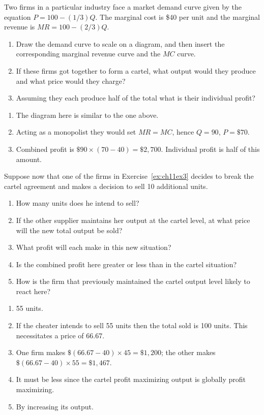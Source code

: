 \begin{enumialphparenastyle}
\begin{ex}\label{ex:ch11ex3}
Two firms in a particular industry face a market demand curve given by the equation $P=100-(1/3)Q$. The marginal cost is \$40 per unit and the marginal revenue is $MR=100-(2/3)Q$.
\begin{enumerate}
	\item	Draw the demand curve to scale on a diagram, and then insert the corresponding marginal revenue curve and the $MC$ curve.
	\item	If these firms got together to form a cartel, what output would they produce and what price would they charge? 
	\item	Assuming they each produce half of the total what is their individual profit?
\end{enumerate}
\begin{sol}
\begin{enumerate}
	\item	The diagram here is similar to the one above.
	\item	Acting as a monopolist they would set $MR=MC$, hence $Q=90$, $P=\$70$.
	\item	Combined profit is $\$90\times(70-40)=\$2,700$. Individual profit is half of this amount.
\end{enumerate}
\end{sol}
\end{ex}

\begin{ex}\label{ex:ch11ex4}
Suppose now that one of the firms in Exercise~\ref{ex:ch11ex3} decides to break the cartel agreement and makes a decision to sell 10 additional units.
\begin{enumerate}
	\item	How many units does he intend to sell?
	\item	If the other supplier maintains her output at the cartel level, at what price will the new total output be sold?
	\item	What profit will each make in this new situation?
	\item	Is the combined profit here greater or less than in the cartel situation?
	\item	How is the firm that previously maintained the cartel output level likely to react here?
\end{enumerate}
\begin{sol}
\begin{enumerate}
	\item	55 units.
	\item	If the cheater intends to sell 55 units then the total sold is 100 units. This necessitates a price of 66.67.
	\item	One firm makes $\$(66.67-40)\times 45=\$1,200$; the other makes $\$(66.67-40)\times 55=\$1,467$.
	\item	It must be less since the cartel profit maximizing output is globally profit maximizing.
	\item	By increasing its output.
\end{enumerate}
\end{sol}
\end{ex}


\end{enumialphparenastyle}
